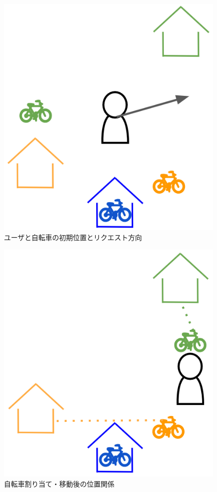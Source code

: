       \begin{figure}[htbp]
        \centering
        \includegraphics[scale=0.6]
        {figures/subjectFunction1-0.png}
        \caption{ユーザと自転車の初期位置とリクエスト方向}
        \label{fig:ユーザと自転車の初期位置とリクエスト方向}
      \end{figure}
      \begin{figure}[htbp]
        \centering
        \includegraphics[scale=0.6]
        {figures/subjectFunction1-1.png}
        \caption{自転車割り当て・移動後の位置関係}
        \label{fig:自転車割り当て・移動後の位置関係}
      \end{figure}
      
